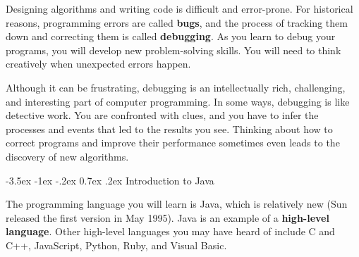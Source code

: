 \documentclass[12pt]{book}
\makeatletter
\renewcommand{\section}{\@startsection {section}{1}{\z@}%
    {-3.5ex \@plus -1ex \@minus -.2ex}%
    {0.7ex \@plus.2ex}%
    {\normalfont\Large\bfseries}}
\theoremstyle{exercise}
\makeatother
\begin{document}

Designing algorithms and writing code is difficult and error-prone.
For historical reasons, programming errors are called {\bf bugs}, and the process of tracking them down and correcting them is called {\bf debugging}.
As you learn to debug your programs, you will develop new problem-solving skills.
You will need to think creatively when unexpected errors happen.




Although it can be frustrating, debugging is an intellectually rich, challenging, and interesting part of computer programming.
In some ways, debugging is like detective work.
You are confronted with clues, and you have to infer the processes and events that led to the results you see.
Thinking about how to correct programs and improve their performance sometimes even leads to the discovery of new algorithms.


\section{Introduction to Java}


The programming language you will learn is Java, which is relatively new (Sun released the first version in May 1995).
Java is an example of a {\bf high-level language}.
Other high-level languages you may have heard of include C and C++, JavaScript, Python, Ruby, and Visual Basic.

\end{document}
